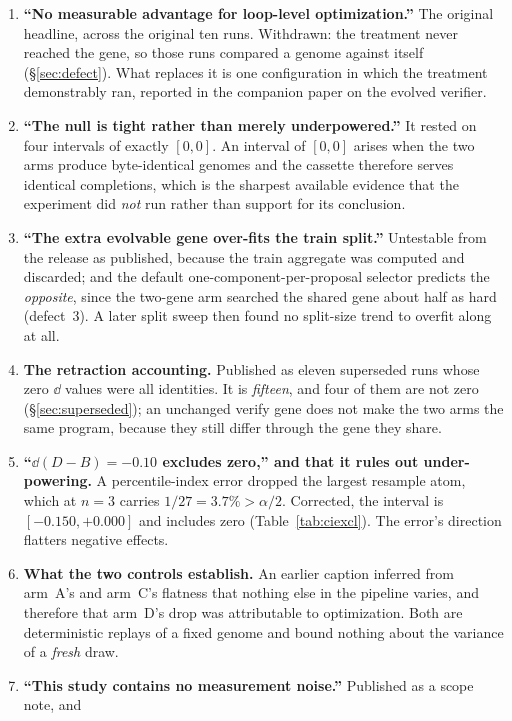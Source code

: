 \documentclass[11pt]{article}
\begin{document}
\begin{enumerate}\itemsep2pt
  \item \textbf{``No measurable advantage for loop-level optimization.''} The original headline,
    across the original ten runs. Withdrawn: the treatment never reached the gene, so those
    runs compared a genome against itself (\S\ref{sec:defect}). What replaces it is one
    configuration in which the treatment demonstrably ran, reported in the companion paper on the evolved verifier.
  \item \textbf{``The null is tight rather than merely underpowered.''} It rested on four
    intervals of exactly $[0,0]$. An interval of $[0,0]$ arises when the two arms produce
    byte-identical genomes and the cassette therefore serves identical completions, which is the
    sharpest available evidence that the experiment did \emph{not} run rather than support for
    its conclusion.
  \item \textbf{``The extra evolvable gene over-fits the train split.''} Untestable from the
    release as published, because the train aggregate was computed and discarded; and the
    default one-component-per-proposal selector predicts the \emph{opposite}, since the two-gene
    arm searched the shared gene about half as hard (defect~3). A later split sweep then found no
    split-size trend to overfit along at all.
  \item \textbf{The retraction accounting.} Published as eleven superseded runs whose zero
    $\dd$ values were all identities. It is \emph{fifteen}, and four of them are not zero
    (\S\ref{sec:superseded}); an unchanged verify gene does not make the two arms the same
    program, because they still differ through the gene they share.
  \item \textbf{``$\dd(D-B) = -0.10$ excludes zero,'' and that it rules out under-powering.} A
    percentile-index error dropped the largest resample atom, which at $n=3$ carries
    $1/27 = 3.7\% > \alpha/2$. Corrected, the interval is $[-0.150,+0.000]$ and includes zero
    (Table~\ref{tab:ciexcl}). The error's direction flatters negative effects.
  \item \textbf{What the two controls establish.} An earlier caption inferred from arm~A's and
    arm~C's flatness that nothing else in the pipeline varies, and therefore that arm~D's drop
    was attributable to optimization. Both are deterministic replays of a fixed genome and bound
    nothing about the variance of a \emph{fresh} draw.
  \item \textbf{``This study contains no measurement noise.''} Published as a scope note, and

\end{enumerate}
\end{document}
